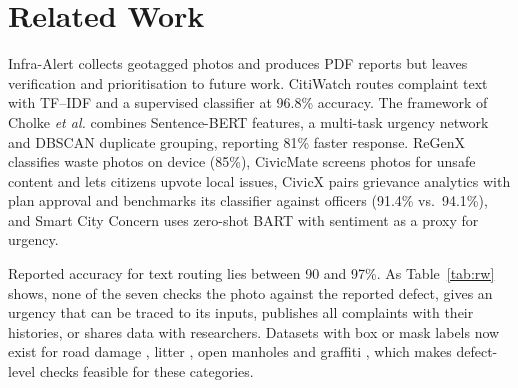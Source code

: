 \documentclass[conference]{IEEEtran}
\begin{document}
\section{Related Work}\label{sec:rw}
Infra-Alert \cite{infraalert} collects geotagged photos and produces PDF reports but leaves verification and prioritisation to future work. CitiWatch \cite{citiwatch} routes complaint text with TF--IDF and a supervised classifier at 96.8\% accuracy. The framework of Cholke \textit{et al.} \cite{cholke} combines Sentence-BERT features, a multi-task urgency network and DBSCAN duplicate grouping, reporting 81\% faster response. ReGenX \cite{regenx} classifies waste photos on device (85\%), CivicMate \cite{civicmate} screens photos for unsafe content and lets citizens upvote local issues, CivicX \cite{civicx} pairs grievance analytics with plan approval and benchmarks its classifier against officers (91.4\% vs.\ 94.1\%), and Smart City Concern \cite{smartcity} uses zero-shot BART with sentiment as a proxy for urgency.

Reported accuracy for text routing lies between 90 and 97\%. As Table~\ref{tab:rw} shows, none of the seven checks the photo against the reported defect, gives an urgency that can be traced to its inputs, publishes all complaints with their histories, or shares data with researchers. Datasets with box or mask labels now exist for road damage \cite{rdd2022,roboflow}, litter \cite{taco}, open manholes \cite{roadhazards} and graffiti \cite{storm}, which makes defect-level checks feasible for these categories.
\end{document}
